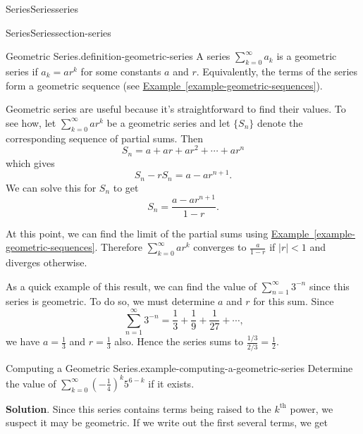\documentclass[oneside,10pt,]{book}
\numberwithin{equation}{section}
\newcommand{\lt}{<}
\begin{document}
\begin{chapterptx}{Series}{}{Series}{}{}{series}
\begin{sectionptx}{Series}{}{Series}{}{}{section-series}
\begin{definition}{Geometric Series.}{definition-geometric-series}%
\hypertarget{p-839}{}%
A series \(\sum_{k=0}^{\infty}a_{k}\) is a geometric series if \(a_{k} = ar^{k}\) for some constants \(a\) and \(r\). Equivalently, the terms of the series form a geometric sequence (see \hyperref[example-geometric-sequences]{Example~\ref{example-geometric-sequences}}).%
\end{definition}
\hypertarget{p-840}{}%
Geometric series are useful because it's straightforward to find their values. To see how, let \(\sum_{k=0}^{\infty}ar^{k}\) be a geometric series and let \(\{S_{n}\}\) denote the corresponding sequence of partial sums. Then%
\begin{equation*}
S_{n} = a + ar + ar^{2} + \cdots + ar^{n}
\end{equation*}
which gives%
\begin{equation*}
S_{n} - rS_{n} = a - ar^{n+1}\text{.}
\end{equation*}
We can solve this for \(S_{n}\) to get%
\begin{equation*}
S_{n} = \frac{a - ar^{n+1}}{1 - r}\text{.}
\end{equation*}
%
\par
\hypertarget{p-841}{}%
At this point, we can find the limit of the partial sums using \hyperref[example-geometric-sequences]{Example~\ref{example-geometric-sequences}}. Therefore \(\sum_{k=0}^{\infty}ar^{k}\) converges to \(\frac{a}{1 - r}\) if \(|r| \lt 1\) and diverges otherwise.%
\par
\hypertarget{p-842}{}%
As a quick example of this result, we can find the value of \(\sum_{n=1}^{\infty}3^{-n}\) since this series is geometric. To do so, we must determine \(a\) and \(r\) for this sum. Since%
\begin{equation*}
\sum_{n=1}^{\infty}3^{-n} = \frac{1}{3} + \frac{1}{9} + \frac{1}{27} + \cdots\text{,}
\end{equation*}
we have \(a = \frac{1}{3}\) and \(r = \frac{1}{3}\) also. Hence the series sums to \(\frac{1/3}{2/3} = \frac{1}{2}\).%
\begin{example}{Computing a Geometric Series.}{example-computing-a-geometric-series}%
\hypertarget{p-843}{}%
Determine the value of \(\sum_{k=0}^{\infty}\left(-\frac{1}{4}\right)^{k} 5^{6 - k}\) if it exists.%
\par\smallskip%
\noindent\textbf{Solution}.\hypertarget{solution-173}{}\quad%
\hypertarget{p-844}{}%
Since this series contains terms being raised to the \(k^{\text{th}}\) power, we suspect it may be geometric. If we write out the first several terms, we get%

\end{example}
\end{sectionptx}
\end{chapterptx}
\end{document}
